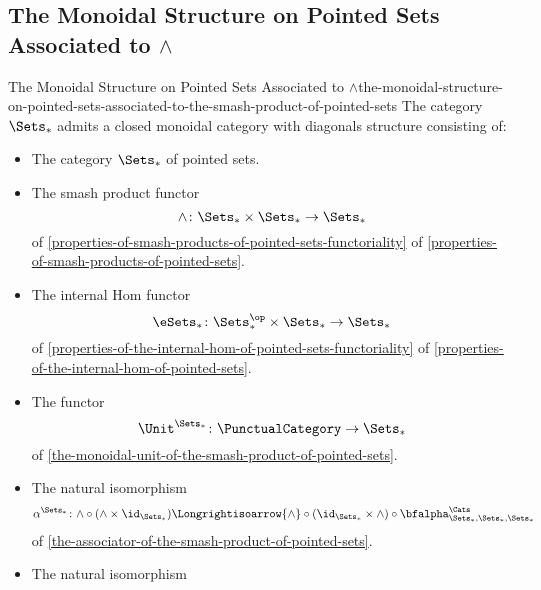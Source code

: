 \subsection{The Monoidal Structure on Pointed Sets Associated to $\wedge$}\label{subsection-the-monoidal-structure-on-pointed-sets-associated-to-the-smash-product-of-pointed-sets}
\begin{proposition}{The Monoidal Structure on Pointed Sets Associated to $\wedge$}{the-monoidal-structure-on-pointed-sets-associated-to-the-smash-product-of-pointed-sets}%
    The category $\Sets_{*}$ admits a closed monoidal category with diagonals structure consisting of:%
    \begin{itemize}
        \item{}The category $\Sets_{*}$ of pointed sets.
        \item{}The smash product functor
            \[
                \wedge%
                \colon%
                \Sets_{*}\times\Sets_{*}%
                \to%
                \Sets_{*}
            \]%
            of \cref{properties-of-smash-products-of-pointed-sets-functoriality} of \cref{properties-of-smash-products-of-pointed-sets}.
        \item{}The internal Hom functor
            \[
                \eSets_{*}%
                \colon%
                \Sets^{\op}_{*}\times\Sets_{*}%
                \to%
                \Sets_{*}%
            \]%
            of \cref{properties-of-the-internal-hom-of-pointed-sets-functoriality} of \cref{properties-of-the-internal-hom-of-pointed-sets}.
        \item{}The functor
            \[
                \Unit^{\Sets_{*}}
                \colon
                \PunctualCategory
                \to
                \Sets_{*}
            \]
            of \cref{the-monoidal-unit-of-the-smash-product-of-pointed-sets}.
        \item{}The natural isomorphism
            \[
                \alpha^{\Sets_{*}}
                \colon
                {\wedge}\circ{({\wedge}\times\id_{\Sets_{*}})}
                \Longrightisoarrow
                {\wedge}\circ{(\id_{\Sets_{*}}\times{\wedge})}\circ{\bfalpha^{\Cats}_{\Sets_{*},\Sets_{*},\Sets_{*}}}
            \]
            of \cref{the-associator-of-the-smash-product-of-pointed-sets}.
        \item{}The natural isomorphism

\end{itemize}
\end{proposition}
